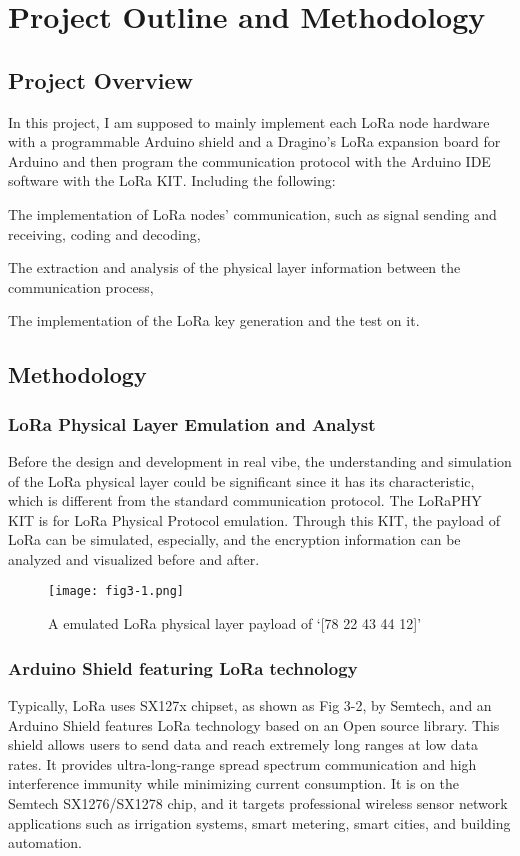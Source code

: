 
\chapter{Project Outline and Methodology}

\section{Project Overview}
In this project, I am supposed to mainly implement each LoRa node hardware with a programmable Arduino shield and a Dragino’s LoRa expansion board for Arduino and then program the communication protocol with the Arduino IDE software with the LoRa KIT. Including the following:

The implementation of LoRa nodes’ communication, such as signal sending and receiving, coding and decoding,

The extraction and analysis of the physical layer information between the communication process,

The implementation of the LoRa key generation and the test on it.

\section{Methodology}

\subsection{LoRa Physical Layer Emulation and Analyst}
Before the design and development in real vibe, the understanding and simulation of the LoRa physical layer could be significant since it has its characteristic, which is different from the standard communication protocol.
The LoRaPHY KIT is for LoRa Physical Protocol emulation\cite{10.1145/3546869}. Through this KIT, the payload of LoRa can be simulated, especially, and the encryption information can be analyzed and visualized before and after.
\begin{figure}
  \centering
  \texttt{[image: fig3-1.png]}
  \caption{A emulated LoRa physical layer payload of ‘[78 22 43 44 12]’}
  \label{fig:3-1}
\end{figure}

\subsection{Arduino Shield featuring LoRa technology}
Typically, LoRa uses SX127x chipset, as shown as Fig 3-2, by Semtech, and an Arduino Shield features LoRa technology based on an Open source library. This shield allows users to send data and reach extremely long ranges at low data rates. It provides ultra-long-range spread spectrum communication and high interference immunity while minimizing current consumption. It is on the Semtech SX1276/SX1278 chip, and it targets professional wireless sensor network applications such as irrigation systems, smart metering, smart cities, and building automation.

